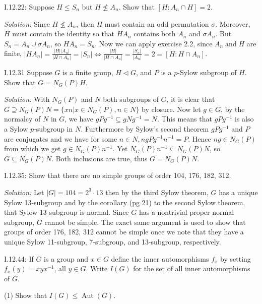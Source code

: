 \documentclass{letter}
\newcommand{\tmem}[1]{{\em #1\/}}
\newcommand{\tmop}[1]{\ensuremath{\operatorname{#1}}}
\begin{document}
I.12.22: Suppose $H \leq S_n$ but $H \nleq A_n$. Show that $[H : A_n \cap H] =
2$.

{\tmem{Solution:}} Since $H \nleq A_n$, then $H$ must contain an odd
permutation $\sigma$. Moreover, $H$ must contain the identity so that $H A_n$
contains both $A_n$ and $\sigma A_n$. But $S_n = A_n \cup \sigma A_n$, so $H
A_n = S_n$. Now we can apply exercise 2.2, since $A_n \tmop{and} H$ are
finite, $|H A_n | = \frac{|H| |A_n |}{|H \cap A_n |} = |S_n | \Leftrightarrow
\frac{|H|}{|H \cap A_n]} = \frac{|S_n |}{|A_n |} = 2 = [H : H \cap A_n]$.

I.12.31 Suppose $G$ is a finite group, $H \vartriangleleft G$, and $P$ is a
$p$-Sylow subgroup of $H$. Show that $G = N_G (P) H$.

{\tmem{Solution:}} With $N_G (P)$ and $N$ both subgroups of $G$, it is clear
that $G \supseteq N_G (P) N =\{x n | x \in N_G (P), n \in N\}$ by closure. Now
let $g \in G$, by the normalcy of $N$ in $G$, we have $g P g^{- 1} \subseteq g
N g^{- 1} = N$. This means that $g P g^{- 1}$ is also a Sylow $p$-subgroup in
$N$. Furthermore by Sylow's second theorem $g P g^{- 1}$ and $P$ are
conjugates and we have for some $n \in N, n g P g^{- 1} n^{- 1} = P$. Hence $n
g \in N_G (P)$ from which we get $g \in N_G (P) n^{- 1}$. Yet $N_G (P) n^{- 1}
\subseteq N_G (P) N$, so $G \subseteq N_G (P) N$. Both inclusions are true,
thus $G = N_G (P) N$.

I.12.35: Show that there are no simple groups of order 104, 176, 182, 312.

{\tmem{Solution:}} Let $|G| = 104 = 2^3 \cdot 13$ then by the third Sylow
theorem, $G$ has a unique Sylow 13-subgroup and by the corollary (pg 21) to
the second Sylow theorem, that Sylow 13-subgroup is normal. Since $G$ has a
nontrivial proper normal subgroup, $G$ cannot be simple. The exact same
argument is used to show that groups of order 176, 182, 312 cannot be simple
once we note that they have a unique Sylow 11-subgroup, 7-subgroup, and
13-subgroup, respectively.

I.12.44: If $G$ is a group and $x \in G$ define the inner automorphisms $f_x$
by setting $f_x (y) = x y x^{- 1}$, all $y \in G$. Write $I (G)$ for the set
of all inner automorphisms of $G$.

(1) Show that $I (G) \leq \tmop{Aut} (G)$.
\end{document}
